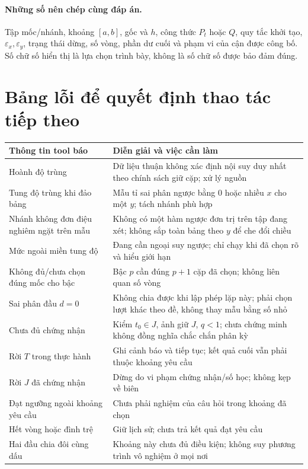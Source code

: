 \paragraph{Những số nên chép cùng đáp án.} Tập mốc/nhánh, khoảng $[a,b]$, gốc và $h$, công thức $P_t$ hoặc $Q$, quy tắc khởi tạo, $\varepsilon_x,\varepsilon_y$, trạng thái dừng, số vòng, phần dư cuối và phạm vi của cận được công bố. Số chữ số hiển thị là lựa chọn trình bày, không là số chữ số được bảo đảm đúng.

\section{Bảng lỗi để quyết định thao tác tiếp theo}
\begin{center}\small
\begin{longtable}{@{}p{.30\linewidth}p{.59\linewidth}@{}}
\toprule
Thông tin tool báo & Diễn giải và việc cần làm\\\midrule\endhead
Hoành độ trùng & Dữ liệu thuận không xác định nội suy duy nhất theo chính sách giữ cặp; xử lý nguồn\\
Tung độ trùng khi đảo bảng & Mẫu tỉ sai phân ngược bằng 0 hoặc nhiều $x$ cho một $y$; tách nhánh phù hợp\\
Nhánh không đơn điệu nghiêm ngặt trên mẫu & Không có một hàm ngược đơn trị trên tập đang xét; không sắp toàn bảng theo $y$ để che đổi chiều\\
Mức ngoài miền tung độ & Đang cần ngoại suy ngược; chỉ chạy khi đã chọn rõ và hiểu giới hạn\\
Không đủ/chưa chọn đúng mốc cho bậc & Bậc $p$ cần đúng $p+1$ cặp đã chọn; không liên quan số vòng\\
Sai phân đầu $d=0$ & Không chia được khi lập phép lặp này; phải chọn lượt khác theo đề, không thay mẫu bằng số nhỏ\\
Chưa đủ chứng nhận & Kiểm $t_0\in J$, ảnh giữ $J$, $q<1$; chưa chứng minh không đồng nghĩa chắc chắn phân kỳ\\
Rời $T$ trong thực hành & Ghi cảnh báo và tiếp tục; kết quả cuối vẫn phải thuộc khoảng yêu cầu\\
Rời $J$ đã chứng nhận & Dừng do vi phạm chứng nhận/số học; không kẹp về biên\\
Đạt ngưỡng ngoài khoảng yêu cầu & Chưa phải nghiệm của câu hỏi trong khoảng đã chọn\\
Hết vòng hoặc đình trệ & Giữ lịch sử; chưa trả kết quả đạt yêu cầu\\
Hai đầu chia đôi cùng dấu & Khoảng này chưa đủ điều kiện; không suy phương trình vô nghiệm ở mọi nơi\\
\bottomrule
\end{longtable}\end{center}

